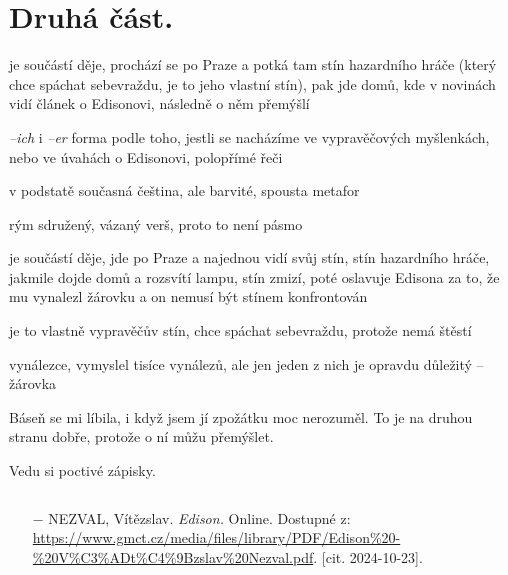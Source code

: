 \documentclass{article}
\begin{document}
\section{Druhá část.}
\begin{description}
    \setlength\itemsep{0.15em}
    \item[vypravěč:] je součástí děje, prochází se po Praze a potká tam stín hazardního hráče (který chce spáchat sebevraždu, je to jeho vlastní stín), pak jde domů, kde v novinách vidí článek o Edisonovi, následně o něm přemýšlí
    \item[vyprávěcí způsoby:] \textit{--ich} i \textit{--er} forma podle toho, jestli se nacházíme ve vypravěčových myšlenkách, nebo ve úvahách o Edisonovi, polopřímé řeči
    \item[typy promluv:]
    \item[jazyková stránka:] v podstatě současná čeština, ale barvité, spousta metafor
    \item[veršová výstavba:] rým sdružený, vázaný verš, proto to není pásmo
    \item[postavy:]
        \begin{description}
            \setlength\itemsep{0.15em}
            \item[vypravěč,] je součástí děje, jde po Praze a najednou vidí svůj stín, stín hazardního hráče, jakmile dojde domů a rozsvítí lampu, stín zmizí, poté oslavuje Edisona za to, že mu vynalezl žárovku a on nemusí být stínem konfrontován
            \item[hazardní hráč,] je to vlastně vypravěčův stín, chce spáchat sebevraždu, protože nemá štěstí
            \item[Edison] vynálezce, vymyslel tisíce vynálezů, ale jen jeden z nich je opravdu důležitý -- žárovka
        \end{description}
    \item[názor:] Báseň se mi líbila, i když jsem jí zpožátku moc nerozuměl. To je na druhou stranu dobře, protože o ní můžu přemýšlet.
    \item[kontext:]  Vedu si poctivé zápisky.
    \item[zdroje:] $ $
    \begin{itemize}
        \setlength\itemsep{0em}
        \item[$-$] NEZVAL, Vítězslav. \textit{Edison.} Online. Dostupné z: \url{https://www.gmct.cz/media/files/library/PDF/Edison%20-%20V%C3%ADt%C4%9Bzslav%20Nezval.pdf}. [cit. 2024-10-23].

    \end{itemize}
\end{description}
\end{document}

